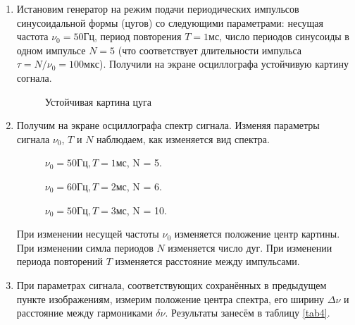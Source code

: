 \documentclass[a4paper,12pt]{article} %
\begin{document}
\begin{enumerate}
    \item Истановим генератор на режим подачи периодических импульсов синусоидальной формы (цугов) со следующими параметрами: несущая частота $ \nu_0 = 50 \text{Гц} $, период повторения $ T = 1 мс $, число периодов синусоиды в одном импульсе $ N = 5 $ (что соответствует длительности импульса $\tau = N/\nu_0 = 100 мкс $). Получили на экране осциллографа устойчивую картину согнала.

    \begin{figure}[h]
        \caption{Устойчивая картина цуга}
        \label{f12}
    \end{figure}

    \item Получим на экране осциллографа спектр сигнала. Изменяя параметры сигнала $\nu_0$, $T$ и $N$ наблюдаем, как изменяется вид спектра.

    \begin{figure}[h]
        \begin{minipage}[h]{0.5\linewidth}
            \caption{$\nu_0 = 50 \text{Гц}, T = 1 \text{мс}$, N = 5.}
        \end{minipage}
        \begin{minipage}[h]{0.5\linewidth}
            \caption{$\nu_0 = 60 \text{Гц}, T = 2 \text{мс}$, N = 6.}
        \end{minipage}
        \begin{minipage}[h]{0.5\linewidth}
            \caption{$\nu_0 = 50 \text{Гц}, T = 3 \text{мс}$, N = 10.}
        \end{minipage}
    \end{figure}

    При изменении несущей частоты $\nu_0$ изменяется положение центр картины. При изменении симла периодов $N$ изменяется число дуг. При изменении периода повторений $T$ изменяется расстояние между импульсами.

    \item При параметрах сигнала, соответствующих сохранённых в предыдущем пункте изображениям, измерим положение центра спектра, его ширину $\Delta \nu$ и расстояние между гармониками $\delta \nu$. Результаты занесём в таблицу \ref{tab4}.


\end{enumerate}
\end{document}
